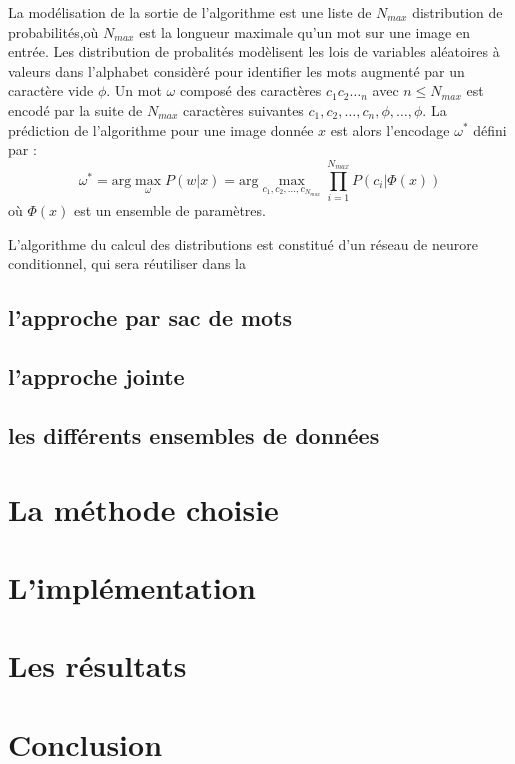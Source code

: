 \documentclass{article}
\begin{document}
La modélisation de la sortie de l'algorithme est une liste de $N_{max}$ distribution de probabilités,où $N_{max}$ est la longueur maximale qu'un mot sur une image en entrée. Les distribution de probalités modèlisent les lois de variables aléatoires à valeurs dans l'alphabet considèré pour identifier les mots augmenté par un caractère vide $\phi$. Un mot $\omega$ composé des caractères $c_1c_2\dotsc_n$ avec $n\leq N_{max}$ est encodé par la suite de $N_{max}$ caractères suivantes $c_1, c_2, \dots,c_n,\phi,\dots,\phi$. La prédiction de l'algorithme pour une image donnée $x$ est alors l'encodage $\omega^*$ défini par :
$$ \omega^* = \text{arg} \max_{\omega} P(w|x) = \text{arg} \max_{c_1, c_2, \dots,c_{N_{max}}} \prod_{i=1}^{N_{max}} P(c_i|\Phi(x))$$
où $\Phi(x)$ est un ensemble de paramètres.

L'algorithme du calcul des distributions est constitué d'un réseau de neurore conditionnel, qui sera réutiliser dans la 

\subsection{l'approche par sac de mots}

\subsection{l'approche jointe}

\subsection{les différents ensembles de données}

\section{La méthode choisie}

\section{L'implémentation}

\section{Les résultats}

\section{Conclusion}
\end{document}
